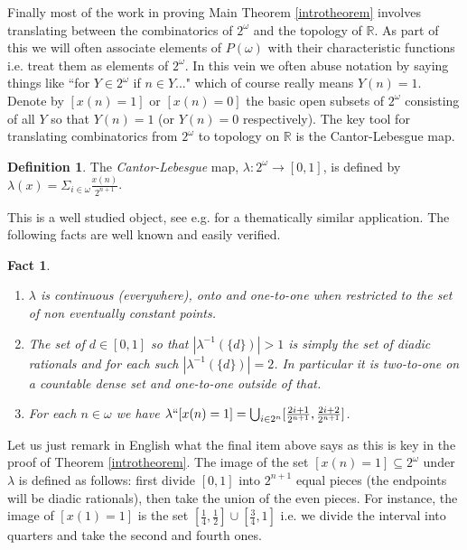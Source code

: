 \documentclass[leqno,11pt]{amsart}
\newtheorem{fact}[theorem]{Fact}
\theoremstyle{definition}
\newtheorem{definition}[theorem]{Definition}
\theoremstyle{remark}
\def\cantor{2^\omega}
\begin{document}
Finally most of the work in proving Main Theorem \ref{introtheorem} involves translating between the combinatorics of $2^\omega$ and the topology of $\mathbb R$. As part of this we will often associate elements of $P(\omega)$ with their characteristic functions i.e. treat them as elements of $2^\omega$. In this vein we often abuse notation by saying things like ``for $Y \in 2^\omega$ if $n \in Y$..." which of course really means $Y(n) = 1$. Denote by $[x(n)=1]$ or $[x(n)=0]$ the basic open subsets of $2^\omega$ consisting of all $Y$ so that $Y(n) = 1$ (or $Y(n) = 0$ respectively).  The key tool for translating combinatorics from $\cantor$ to topology on $\mathbb R$ is the Cantor-Lebesgue map. %

\begin{definition}
    The {\em Cantor-Lebesgue} map, $\lambda:2^\omega \to [0, 1]$, is defined by $\lambda (x) = \Sigma_{i \in \omega} \frac{x(n)}{2^{n+1}}$. 
\end{definition}

This is a well studied object, see e.g. \cite{weiss} for a thematically similar application. The following facts are well known and easily verified.
\begin{fact}
    \begin{enumerate}
        \item $\lambda$ is continuous (everywhere), onto and one-to-one when restricted to the set of non eventually constant points.
        \item The set of $d \in [0, 1]$ so that $|\lambda^{-1}(\{d\})| > 1$ is simply the set of diadic rationals and for each such $|\lambda^{-1}(\{d\})| = 2$. In particular it is two-to-one on a countable dense set and one-to-one outside of that.
        \item For each $n \in \omega$ we have $\lambda ``[x(n)=1] = \bigcup_{i\in 2^{n}} [\frac{2i+1}{2^{n+1}}, \frac{2i + 2}{2^{n+1}}]$. 
    \end{enumerate}
\end{fact}

Let us just remark in English what the final item above says as this is key in the proof of Theorem \ref{introtheorem}. The image of the set $[x(n)=1] \subseteq \cantor$ under $\lambda$ is defined as follows: first divide $[0,1]$ into $2^{n+1}$ equal pieces (the endpoints will be diadic rationals), then take the union of the even pieces. For instance, the image of $[x(1) = 1]$ is the set $[\frac{1}{4}, \frac{1}{2}] \cup [\frac{3}{4}, 1]$ i.e. we divide the interval into quarters and take the second and fourth ones. 
\end{document}
